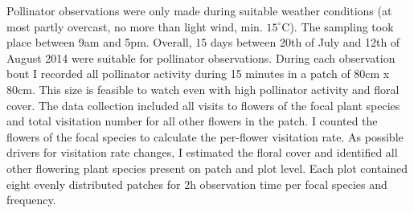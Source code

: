 Pollinator observations were only made during suitable weather conditions (at most partly overcast, no more than light wind, min. $15 ^\circ\text{C}$). The sampling took place between 9am and 5pm. Overall, 15 days between 20th of July and 12th of August 2014 were suitable for pollinator observations. 
During each observation bout I recorded all pollinator activity during 15 minutes in a patch of 80cm x 80cm. This size is feasible to watch even with high pollinator activity and floral cover. The data collection included all visits to flowers of the focal plant species and total visitation number for all other flowers in the patch. I counted the flowers of the focal species to calculate the per-flower visitation rate. As possible drivers for visitation rate changes, I estimated the floral cover and identified all other flowering plant species present on patch and plot level. Each plot contained eight evenly distributed patches for 2h observation time per focal species and frequency. 

